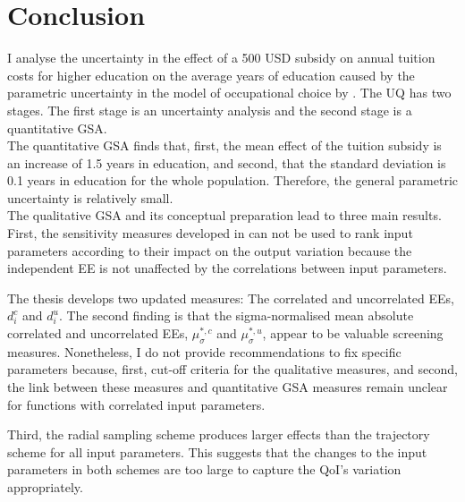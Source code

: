 \section{Conclusion}
\thispagestyle{plain}  %

\noindent
I analyse the uncertainty in the effect of a 500 USD subsidy on annual tuition costs for higher education on the average years of education caused by the parametric uncertainty in the model of occupational choice by \cite{Keane.1994}. The UQ has two stages. The first stage is an uncertainty analysis and the second stage is a quantitative GSA.\\

\noindent
The quantitative GSA finds that, first, the mean effect of the tuition subsidy is an increase of 1.5 years in education, and second, that the standard deviation is 0.1 years in education for the whole population. Therefore, the general parametric uncertainty is relatively small.\\

\noindent
The qualitative GSA and its conceptual preparation lead to three main results.
First, the sensitivity measures developed in \cite{ge2017extending} can not be used to rank input parameters according to their impact on the output variation because the independent EE is not unaffected by the correlations between input parameters.

The thesis develops two updated measures: The correlated and uncorrelated EEs, $d_i^{c}$ and $d_i^{u}$. The second finding is that the sigma-normalised mean absolute correlated and uncorrelated EEs, $\mu^{*,c}_{\sigma}$ and $\mu^{*,u}_{\sigma}$, appear to be valuable screening measures. Nonetheless, I do not provide recommendations to fix specific parameters because, first, cut-off criteria for the qualitative measures, and second, the link between these measures and quantitative GSA measures remain unclear for functions with correlated input parameters.


Third, the radial sampling scheme produces larger effects than the trajectory scheme for all input parameters. This suggests that the changes to the input parameters in both schemes are too large to capture the QoI's variation appropriately.